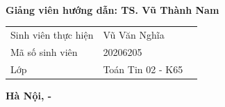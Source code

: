 \begin{titlepage}
\begin{center}
\textbf{\fontsize{16pt}{30pt}\selectfont {BÁO CÁO ĐỒ ÁN II}} \\

\textbf{\fontsize{20pt}{24pt}\selectfont {Chuyên ngành: TOÁN TIN}}

\vspace{1cm}

\textbf{\fontsize{20pt}{24pt}\selectfont {ĐỀ TÀI:}} \\

\textbf{\fontsize{19pt}{24pt}\selectfont {Xây dựng kiến trúc vi dịch vụ cho bài toán hóa đơn điện tử}} \\


\end{center}

\vspace{0.7cm}

\hspace{2.4cm}

\begin{minipage}{0.8\textwidth}

\textbf{Giảng viên hướng dẫn: TS. Vũ Thành Nam}

\end{minipage}

\hspace{3cm}

\begin{minipage}{0.7\textwidth}

\begin{tabular}{l l l}

Sinh viên thực hiện & Vũ Văn Nghĩa \\

Mã số sinh viên & 20206205 \\

Lớp & Toán Tin 02 - K65 \\

\end{tabular}

\end{minipage}

\vspace{0.5cm}

\begin{center}

\textbf{Hà Nội, \the\month - \the\year}

\end{center}

\end{titlepage}

